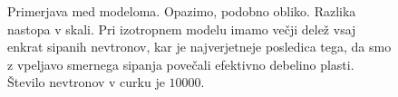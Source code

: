 \documentclass[slovene,11pt,a4paper]{article}
\numberwithin{equation}{section} %
\numberwithin{figure}{section} %
\numberwithin{table}{section} %
\begin{document}
\begin{figure}[h]
\noindent{}
\caption{Primerjava med modeloma. Opazimo, podobno obliko. Razlika nastopa v skali. Pri izotropnem modelu imamo večji delež vsaj enkrat sipanih nevtronov, kar je najverjetneje posledica tega, da smo z vpeljavo smernega sipanja povečali efektivno debelino plasti. Število nevtronov v curku je $10000$.}
\end{figure}
\end{document}
